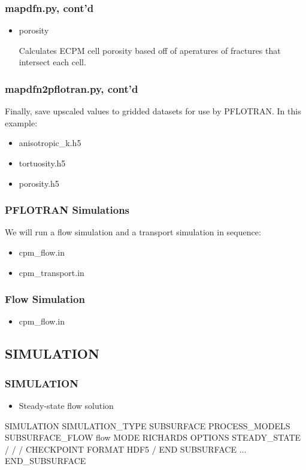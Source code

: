 \documentclass{beamer}
\newcommand\magentacomment[1]{{{\color{magenta} #1}}}
\begin{document}
\begin{frame} \frametitle{mapdfn.py, cont'd}
	\begin{itemize}
		\item \begin{semiverbatim}\magentacomment{porosity}\end{semiverbatim} Calculates ECPM cell porosity based off of aperatures of fractures that intersect each cell.
	\end{itemize}
	
\end{frame}

\begin{frame} \frametitle{mapdfn2pflotran.py, cont'd}
	Finally, save upscaled values to gridded datasets for use by PFLOTRAN. In this example:
	\begin{itemize}
		\item anisotropic\_k.h5
		\item tortuosity.h5
		\item porosity.h5
	\end{itemize}
	
\end{frame}

\begin{frame} [fragile,]\frametitle{PFLOTRAN Simulations}
	We will run a flow simulation and a transport simulation in sequence:
	\begin{itemize}
		\item cpm\_flow.in
		\item cpm\_transport.in
	\end{itemize}
\end{frame}

\begin{frame} [fragile,]\frametitle{Flow Simulation}
	\begin{itemize}
		\item cpm\_flow.in
	\end{itemize}
\end{frame}

\subsection{SIMULATION}

\begin{frame}\frametitle{SIMULATION}

\begin{itemize}
  \item Steady-state flow solution
\end{itemize}
\begin{semiverbatim}
SIMULATION
  SIMULATION_TYPE SUBSURFACE
  PROCESS_MODELS
    SUBSURFACE_FLOW flow
      MODE RICHARDS
      \magentacomment{OPTIONS
         STEADY_STATE
       /}
    /
/
\magentacomment{CHECKPOINT
FORMAT HDF5
/}
END
SUBSURFACE
  ...
END_SUBSURFACE
\end{semiverbatim}

\end{frame}
\end{document}

